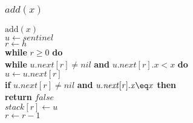 \documentclass{beamer}
\begin{document}
\begin{frame}[shrink]
\frametitle{$add(x)$}
\begin{flushleft}
\ensuremath{\mathrm{add}(\ensuremath{\mathit{x}})}\\
\hspace*{1em} \ensuremath{\ensuremath{\mathit{u}} \gets  \ensuremath{sentinel}}\\
\hspace*{1em} \ensuremath{\ensuremath{\mathit{r}} \gets  \ensuremath{h}}\\
\hspace*{1em} {\color{black} \textbf{while}} \ensuremath{\ensuremath{\mathit{r}} \ge 0} {\color{black} \textbf{do}} \\
\hspace*{1em} \hspace*{1em} {\color{black} \textbf{while}} \ensuremath{\ensuremath{\mathit{u}}.\ensuremath{\mathit{next}}[\ensuremath{\mathit{r}}] \ne nil} {\color{black} \textbf{and}} \ensuremath{\ensuremath{\mathit{u}}.\ensuremath{\mathit{next}}[\ensuremath{\mathit{r}}].\ensuremath{\mathit{x}} < x} {\color{black} \textbf{do}} \\
\hspace*{1em} \hspace*{1em} \hspace*{1em} \ensuremath{\ensuremath{\mathit{u}} \gets  \ensuremath{\ensuremath{\mathit{u}}.\ensuremath{\mathit{next}}[\ensuremath{\mathit{r}}]}}\\
\hspace*{1em} \hspace*{1em} {\color{black} \textbf{if}} \ensuremath{\ensuremath{\mathit{u}}.\ensuremath{\mathit{next}}[\ensuremath{\mathit{r}}] \ne nil} {\color{black} \textbf{and}} \ensuremath{\ensuremath{\mathit{u}}.\ensuremath{\mathit{next}}[\ensuremath{\mathit{r}}].\ensuremath{\mathit{x}} \eq x} {\color{black} \textbf{then}}\\
\hspace*{1em} \hspace*{1em} \hspace*{1em}   {\color{black} \textbf{return}} \ensuremath{\ensuremath{\mathit{false}}}\\
\hspace*{1em} \hspace*{1em} \ensuremath{\ensuremath{\mathit{stack}}[\ensuremath{r}] \gets  \ensuremath{u}}\\
\hspace*{1em} \hspace*{1em} \ensuremath{\ensuremath{\mathit{r}} \gets  \ensuremath{\ensuremath{\mathit{r}} - 1}}\\

\end{flushleft}
\end{frame}
\end{document}
